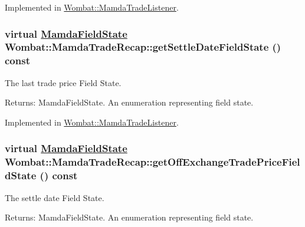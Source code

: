 Implemented in \hyperlink{classWombat_1_1MamdaTradeListener_f487197ee5cad3e13470e8363e667702}{Wombat::Mamda\-Trade\-Listener}.\hypertarget{classWombat_1_1MamdaTradeRecap_8f2dc16d498df59f741eb2eab59ca95a}{
\subsubsection[getSettleDateFieldState]{\setlength{\rightskip}{0pt plus 5cm}virtual \hyperlink{namespaceWombat_93aac974f2ab713554fd12a1fa3b7d2a}{Mamda\-Field\-State} Wombat::Mamda\-Trade\-Recap::get\-Settle\-Date\-Field\-State () const}}
\label{classWombat_1_1MamdaTradeRecap_8f2dc16d498df59f741eb2eab59ca95a}


The last trade price Field State. 

\begin{Desc}
\item[Returns:]Mamda\-Field\-State. An enumeration representing field state. \end{Desc}


Implemented in \hyperlink{classWombat_1_1MamdaTradeListener_75af0c0e81cb87dcf0029f79ecb13262}{Wombat::Mamda\-Trade\-Listener}.\hypertarget{classWombat_1_1MamdaTradeRecap_da82568c7dabc3507fe6a3a8b27324c0}{
\subsubsection[getOffExchangeTradePriceFieldState]{\setlength{\rightskip}{0pt plus 5cm}virtual \hyperlink{namespaceWombat_93aac974f2ab713554fd12a1fa3b7d2a}{Mamda\-Field\-State} Wombat::Mamda\-Trade\-Recap::get\-Off\-Exchange\-Trade\-Price\-Field\-State () const}}
\label{classWombat_1_1MamdaTradeRecap_da82568c7dabc3507fe6a3a8b27324c0}


The settle date Field State. 

\begin{Desc}
\item[Returns:]Mamda\-Field\-State. An enumeration representing field state. \end{Desc}


